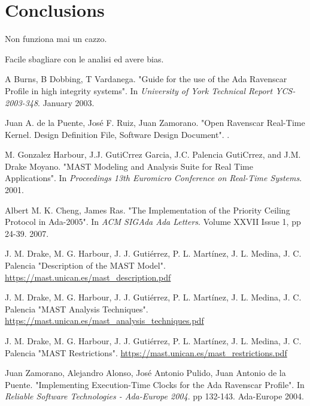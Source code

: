 \documentclass{article}
\begin{document}
\section{Conclusions}

Non funziona mai un cazzo.

Facile sbagliare con le analisi ed avere bias.




\begin{thebibliography}{1}

A Burns, B Dobbing, T Vardanega.
\newblock "Guide for the use of the Ada Ravenscar Profile in high integrity systems".
\newblock In {\em University of York Technical Report YCS-2003-348}. January 2003.

Juan A. de la Puente, José F. Ruiz, Juan Zamorano.
\newblock "Open Ravenscar Real-Time Kernel. Design Definition File, Software Design Document".
.

M. Gonzalez Harbour, J.J. GutiCrrez Garcia, J.C. Palencia GutiCrrez, and J.M. Drake Moyano.
\newblock "MAST Modeling and Analysis Suite for Real Time Applications".
\newblock In {\em Proceedings 13th Euromicro Conference on Real-Time Systems}. 2001.

Albert M. K. Cheng, James Ras.
\newblock "The Implementation of the Priority Ceiling Protocol in Ada-2005".
\newblock In {\em ACM SIGAda Ada Letters}. Volume XXVII Issue 1, pp 24-39. 2007.

J. M. Drake, M. G. Harbour, J. J. Gutiérrez, P. L. Martínez, J. L. Medina, J. C. Palencia
\newblock "Description of the MAST Model".
\newblock \url{https://mast.unican.es/mast_description.pdf}

J. M. Drake, M. G. Harbour, J. J. Gutiérrez, P. L. Martínez, J. L. Medina, J. C. Palencia
\newblock "MAST Analysis Techniques".
\newblock \url{https://mast.unican.es/mast_analysis_techniques.pdf}

J. M. Drake, M. G. Harbour, J. J. Gutiérrez, P. L. Martínez, J. L. Medina, J. C. Palencia
\newblock "MAST Restrictions".
\newblock \url{https://mast.unican.es/mast_restrictions.pdf}

Juan Zamorano, Alejandro Alonso, José Antonio Pulido, Juan Antonio de la Puente.
\newblock "Implementing Execution-Time Clocks for the Ada Ravenscar Profile".
\newblock In {\em Reliable Software Technologies - Ada-Europe 2004}. pp 132-143. Ada-Europe 2004.


\end{thebibliography}
\end{document}
